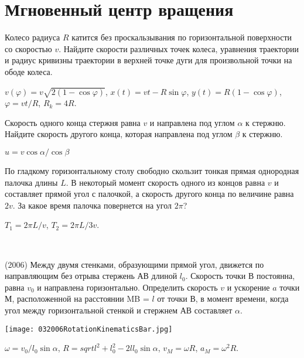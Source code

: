 \section{Мгновенный центр вращения}

\begin{ex}
Колесо радиуса $R$ катится без проскальзывания по горизонтальной поверхности со скоростью $v$. 
Найдите скорости различных точек колеса, уравнения траектории и радиус кривизны траектории в верхней точке дуги для произвольной точки на ободе колеса.
\begin{ans}
$v(\varphi) = v\sqrt{2(1- \cos \varphi)}$, $x(t) = vt - R \sin \varphi$, $y(t) = R(1 - \cos \varphi)$, $\varphi = vt / R$, $R_k = 4R$.
\end{ans}
\end{ex}

\begin{ex}
Скорость одного конца стержня равна $v$ и направлена под углом $\alpha$ к стержню. Найдите скорость другого конца, которая направлена под углом $\beta$ к стержню.
\begin{ans}
$u = v \cos \alpha / \cos \beta$
\end{ans}
\end{ex}

\begin{ex}
По гладкому горизонтальному столу свободно скользит тонкая прямая однородная палочка длины $L$. 
В некоторый момент скорость одного из концов равна $v$ и составляет прямой угол с палочкой, 
а скорость другого конца по величине равна $2v$. За какое время палочка повернется на угол $2\pi$?
\begin{ans}
$T_1 = 2 \pi L/v$, $T_2 = 2 \pi L/3v$.
\end{ans}
\end{ex}

\begin{ex}
\hspace{0pt} \\
\begin{minipage}{.65\textwidth}
(2006) Между двумя стенками, образующими прямой угол, движется по направляющим без отрыва стержень АВ длиной $l_0$. 
Скорость точки В постоянна, равна $v_0$ и направлена горизонтально. Определить скорость $v$ и ускорение $a$ точки М, расположенной на расстоянии MB = $l$ от точки В, в момент времени, когда угол между горизонтальной стенкой и стержнем АВ составляет $\alpha$.
\end{minipage}
\begin{minipage}{.35\textwidth}
\centering
\texttt{[image: 032006RotationKinematicsBar.jpg]}
\end{minipage}
\begin{ans}
$\omega = v_0/l_0 \sin \alpha$, $R = sqrt{l^2 + l_0^2 - 2ll_0 \sin \alpha}$, $v_M = \omega R$, $a_M = \omega^2 R$.
\end{ans}
\end{ex}

